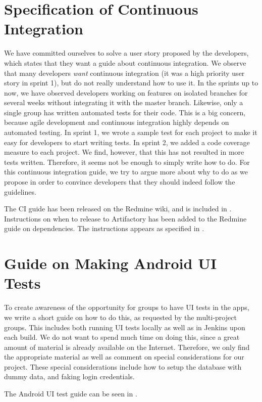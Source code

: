 \section{Specification of Continuous Integration}\label{sec:specsCI}
We have committed ourselves to solve a user story proposed by the developers, which states that they want a guide about continuous integration. We observe that many developers \emph{want} continuous integration (it was a high priority user story in sprint 1), but do not really understand how to use it. In the sprints up to now, we have observed developers working on features on isolated branches for several weeks without integrating it with the master branch. Likewise, only a single group has written automated tests for their code. This is a big concern, because agile development and continuous integration highly depends on automated testing. In sprint 1, we wrote a sample test for each project to make it easy for developers to start writing tests. In sprint 2, we added a code coverage measure to each project. We find, however, that this has not resulted in more tests written. Therefore, it seems not be enough to simply write how to do. For this continuous integration guide, we try to argue more about why to do as we propose in order to convince developers that they should indeed follow the guidelines.

The CI guide has been released on the Redmine wiki, and is included in . Instructions on when to release to Artifactory has been added to the Redmine guide on dependencies. The instructions appears as specified in .

\section{Guide on Making Android UI Tests}\label{sec:uitestguide}
To create awareness of the opportunity for groups to have UI tests in the apps, we write a short guide on how to do this, as requested by the multi-project groups. This includes both running UI tests locally as well as in Jenkins upon each build. We do not want to spend much time on doing this, since a great amount of material is already available on the Internet. Therefore, we only find the appropriate material as well as comment on special considerations for our project. These special considerations include how to setup the database with dummy data, and faking login credentials.

The Android UI test guide can be seen in .